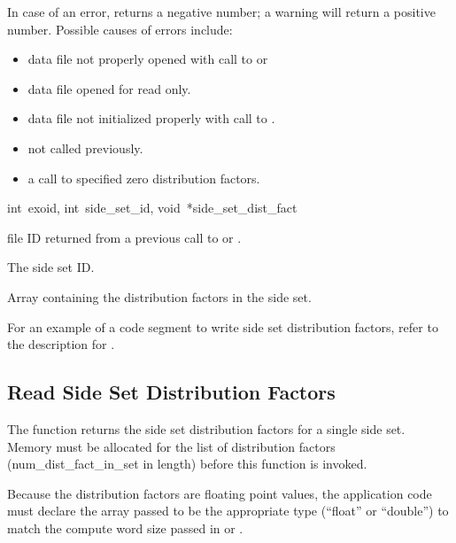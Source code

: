 In case of an error,  returns 
a negative number; a warning will return a positive number. 
Possible causes of errors include:

\begin{itemize}
 \item data file not properly opened with call to 
 or 

 \item data file opened for read only.

 \item data file not initialized properly with call to
 .

 \item {} not called previously.

 \item a call to  specified zero
 distribution factors.
\end{itemize}


{int~exoid, 
int~side_set_id, 
void~*side_set_dist_fact}

\begin{parameters}
\item[{int exoid \R{}}]
\exo{} file ID returned from a previous call to  
or .

\item[{int side_set_id \R{}}]
The side set ID.

\item[{void* side_set_dist_fact \R{}}]
Array containing the distribution factors in the side set.
\end{parameters}

For an example of a code segment to write side set distribution
factors, refer to the description for
.




\subsection{Read Side Set Distribution Factors}

The function  returns the side
set distribution factors for a single side set. Memory must be
allocated for the list of distribution factors
({num_dist_fact_in_set} in length) before this function is
invoked.

Because the distribution factors are floating point values, the
application code must declare the array passed to be the appropriate
type (``float'' or ``double'') to match the compute word size passed
in  or .

